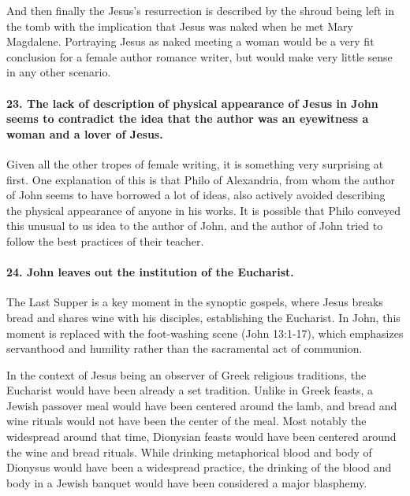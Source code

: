 And then finally the Jesus's resurrection is described by the shroud being left in the tomb with the implication that Jesus was naked when he met Mary Magdalene.
Portraying Jesus as naked meeting a woman would be a very fit conclusion for a female author romance writer, but would make very little sense in any other scenario.

\paragraph{23.
The lack of description of physical appearance of Jesus in John seems to contradict the idea that the author was an eyewitness a woman and a lover of Jesus.}\label{par:the-lack-of-description-of-physical-appearance-of-jesus-in-john-seems-to-contradict-the-idea-that-the-author-was-an-eyewitness-a-woman-and-a-lover-of-jesus.}

Given all the other tropes of female writing, it is something very surprising at first.
One explanation of this is that Philo of Alexandria, from whom the author of John seems to have borrowed a lot of ideas, also actively avoided describing the physical appearance of anyone in his works.
It is possible that Philo conveyed this unusual to us idea to the author of John, and the author of John tried to follow the best practices of their teacher.

\paragraph{24.
John leaves out the institution of the Eucharist.}\label{par:john-leaves-out-the-institution-of-the-eucharist.}

The Last Supper is a key moment in the synoptic gospels, where Jesus breaks bread and shares wine with his disciples, establishing the Eucharist.
In John, this moment is replaced with the foot-washing scene (John 13:1-17), which emphasizes servanthood and humility rather than the sacramental act of communion.

In the context of Jesus being an observer of Greek religious traditions, the Eucharist would have been already a set tradition.
Unlike in Greek feasts, a Jewish passover meal would have been centered around the lamb, and bread and wine rituals would not have been the center of the meal.
Most notably the widespread around that time, Dionysian feasts would have been centered around the wine and bread rituals.
While drinking metaphorical blood and body of Dionysus would have been a widespread practice, the drinking of the blood and body in a Jewish banquet would have been considered a major blasphemy.

